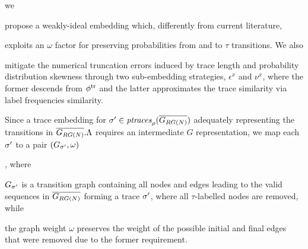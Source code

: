 {{{%
%
we
\begin{alphalist} \item propose a weakly-ideal embedding \cite{Gartner03} which, differently from current literature, \item exploits an
$\omega$ factor for preserving probabilities from and to $\tau$ transitions. We also \item mitigate the
numerical truncation errors induced by trace length and probability distribution skewness through two sub-embedding strategies,
$\epsilon^x$ and $\nu^x$, where the former descends from $\trembed$ and the latter approximates the trace similarity via label frequencies similarity.
\end{alphalist}
Since a trace embedding for $\nonlogtrace\in\WCal{\pmin}{n}$ adequately representing the transitions in $\expN.\Lambda$ requires an intermediate $G$ representation, we map each $\nonlogtrace$ to a pair $(\tg_\nonlogtrace,\omega)$}, where \begin{inparaenum}[\it (i)]
\item $\tg_\nonlogtrace$ is a transition graph containing all nodes and edges leading to the valid sequences in $\expN$ forming a trace $\nonlogtrace$, where all $\tau$-labelled nodes are removed, while
\item the graph weight $\omega$ preserves the weight of the possible initial and final edges that were removed due to the former requirement.
\end{inparaenum}
%
%
%
%
}}
